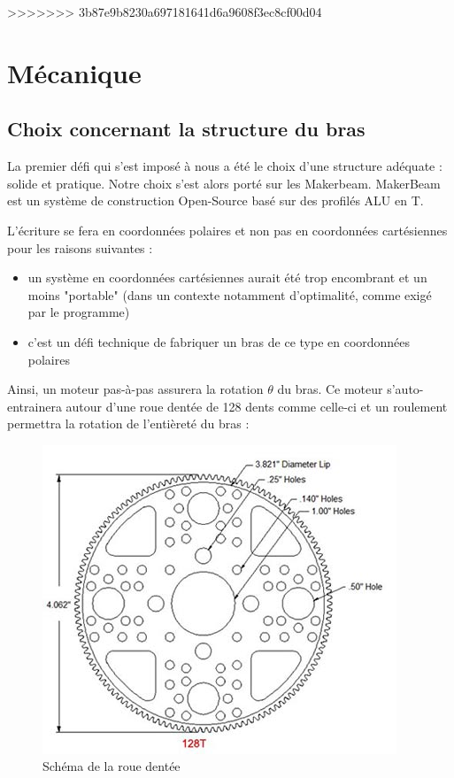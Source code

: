 \documentclass[12pt,a4paper]{report}
\begin{document}
>>>>>>> 3b87e9b8230a697181641d6a9608f3ec8cf00d04
	\chapter{Mécanique}
	\section{Choix concernant la structure du bras}
	La premier défi qui s'est imposé à nous a été le choix d'une structure adéquate : solide et pratique. Notre choix s'est alors porté sur les Makerbeam. MakerBeam est un système de construction Open-Source basé sur des profilés ALU en T.
	
	L'écriture se fera en coordonnées polaires et non pas en coordonnées cartésiennes pour les raisons suivantes :
	\begin{itemize}[label=--]
	\item un système en coordonnées cartésiennes aurait été trop encombrant et un moins "portable" (dans un contexte notamment d'optimalité, comme exigé par le programme)
	\item c'est un défi technique de fabriquer un bras de ce type en coordonnées polaires
	\end{itemize}
	
Ainsi, un moteur pas-à-pas assurera la rotation $\theta$ du bras. Ce moteur s'auto-entrainera autour d'une roue dentée de 128 dents comme celle-ci et un roulement permettra la rotation de l'entièreté du bras :

\begin{figure}[!h]
 \center
 \includegraphics[scale=0.5]{../pictures/rouedentee2.jpg}
 \caption{Schéma de la roue dentée}
\end{figure}
\end{document}
